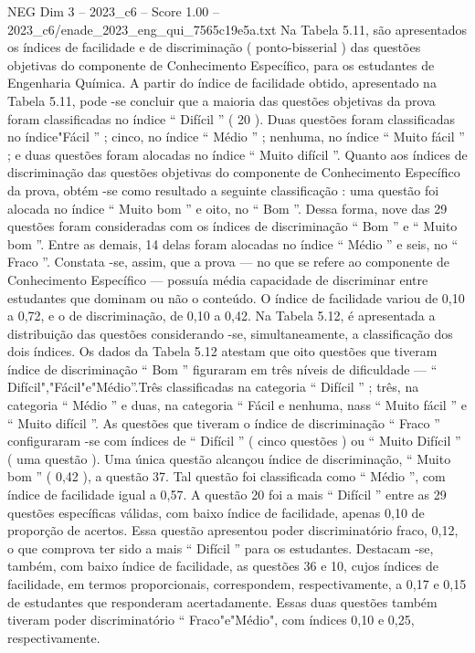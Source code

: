 \begin{textsample}{NEG Dim 3 – 2023\_c6 – Score 1.00 – 2023\_c6/enade\_2023\_eng\_qui\_7565c19e5a.txt}
Na Tabela 5.11, são apresentados os índices de facilidade e de discriminação ( ponto-bisserial ) das questões objetivas do componente de Conhecimento Específico, para os estudantes de Engenharia Química.
A partir do índice de facilidade obtido, apresentado na Tabela 5.11, pode -se concluir que a maioria das questões objetivas da prova foram classificadas no índice “ Difícil ” ( 20 ).
Duas questões foram classificadas no índice"Fácil ” ; cinco, no índice “ Médio ” ; nenhuma, no índice “ Muito fácil ” ; e duas questões foram alocadas no índice “ Muito difícil ”.
Quanto aos índices de discriminação das questões objetivas do componente de Conhecimento Específico da prova, obtém -se como resultado a seguinte classificação : uma questão foi alocada no índice “ Muito bom ” e oito, no “ Bom ”.
Dessa forma, nove das 29 questões foram consideradas com os índices de discriminação “ Bom ” e “ Muito bom ”.
Entre as demais, 14 delas foram alocadas no índice “ Médio ” e seis, no “ Fraco ”.
Constata -se, assim, que a prova — no que se refere ao componente de Conhecimento Específico — possuía média capacidade de discriminar entre estudantes que dominam ou não o conteúdo.
O índice de facilidade variou de 0,10 a 0,72, e o de discriminação, de 0,10 a 0,42.
Na Tabela 5.12, é apresentada a distribuição das questões considerando -se, simultaneamente, a classificação dos dois índices.
Os dados da Tabela 5.12 atestam que oito questões que tiveram índice de discriminação “ Bom ” figuraram em três níveis de dificuldade — “ Difícil","Fácil"e"Médio”.Três classificadas na categoria “ Difícil ” ; três, na categoria “ Médio ” e duas, na categoria “ Fácil e nenhuma, nass “ Muito fácil ” e “ Muito difícil ”.
As questões que tiveram o índice de discriminação “ Fraco ” configuraram -se com índices de “ Difícil ” ( cinco questões ) ou “ Muito Difícil ” ( uma questão ).
Uma única questão alcançou índice de discriminação, “ Muito bom ” ( 0,42 ), a questão 37.
Tal questão foi classificada como “ Médio ”, com índice de facilidade igual a 0,57.
A questão 20 foi a mais “ Difícil ” entre as 29 questões específicas válidas, com baixo índice de facilidade, apenas 0,10 de proporção de acertos.
Essa questão apresentou poder discriminatório fraco, 0,12, o que comprova ter sido a mais “ Difícil ” para os estudantes.
Destacam -se, também, com baixo índice de facilidade, as questões 36 e 10, cujos índices de facilidade, em termos proporcionais, correspondem, respectivamente, a 0,17 e 0,15 de estudantes que responderam acertadamente.
Essas duas questões também tiveram poder discriminatório “ Fraco"e"Médio", com índices 0,10 e 0,25, respectivamente.

\end{textsample}
